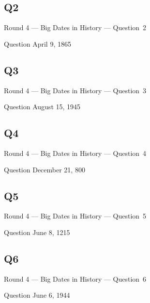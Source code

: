 \documentclass[11pt]{beamer}
\begin{document}
\subsection*{Q2}
\begin{frame}[t]{Round 4 --- Big Dates in History --- \mbox{Question 2}}
\begin{block}{Question}
April 9, 1865
\end{block}
\end{frame}
\subsection*{Q3}
\begin{frame}[t]{Round 4 --- Big Dates in History --- \mbox{Question 3}}
\begin{block}{Question}
August 15, 1945
\end{block}
\end{frame}
\subsection*{Q4}
\begin{frame}[t]{Round 4 --- Big Dates in History --- \mbox{Question 4}}
\begin{block}{Question}
December 21, 800
\end{block}
\end{frame}
\subsection*{Q5}
\begin{frame}[t]{Round 4 --- Big Dates in History --- \mbox{Question 5}}
\begin{block}{Question}
June 8, 1215
\end{block}
\end{frame}
\subsection*{Q6}
\begin{frame}[t]{Round 4 --- Big Dates in History --- \mbox{Question 6}}
\begin{block}{Question}
June 6, 1944
\end{block}
\end{frame}
\end{document}
